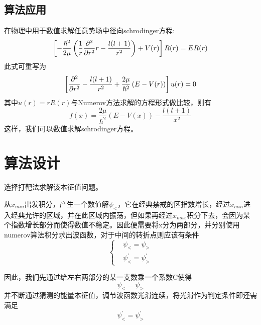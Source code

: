 \documentclass[twoside,twocolumn]{article}
\begin{document}
\begin{CJK*}{UTF8}{gkai}
\subsection{算法应用}
在物理中用于数值求解任意势场中径向schrodinger方程:
\begin{equation*}
\left[-{\hbar ^{2} \over 2\mu }\left({\frac {1}{r}}{\partial ^{2} \over \partial r^{2}}r-{l(l+1) \over r^{2}}\right)+V(r)\right]R(r)=ER(r)
\end{equation*}
此式可重写为
\begin{equation*}
\left[{\partial ^{2} \over \partial r^{2}}-{l(l+1) \over r^{2}}+{2\mu \over \hbar ^{2}}\left(E-V(r)\right)\right]u(r)=0
\end{equation*}
其中$u(r)=rR(r)$与Numerov方法求解的方程形式做比较，则有
\begin{equation*}
f(x)={\frac {2\mu }{\hbar ^{2}}}\left(E-V(x)\right)-{\frac {l(l+1)}{x^{2}}}
\end{equation*}
这样，我们可以数值求解schrodinger方程。


\section{算法设计}
选择打靶法求解该本征值问题。

从$x_{min}$出发积分，产生一个数值解$\psi_{<}$，它在经典禁戒的区指数增长，经过$x_{min}$进入经典允许的区域，并在此区域内振荡，但如果再经过$x_{max}$积分下去，会因为某个指数增长部分而使得数值不稳定。因此便需要将x分为两部分，并分别使用numerov算法积分求出波函数，对于中间的转折点则应该有条件
\begin{equation*}
\left\{
\begin{aligned}
&\psi_{<}=\psi_{>}\\
&\psi_{<}^{\prime}=\psi_{>}^{\prime}
\end{aligned}
\right.
\end{equation*}

因此，我们先通过给左右两部分的某一支数乘一个系数C使得
\begin{equation*}
\psi_{<}=\psi_{>}
\end{equation*}
并不断通过猜测的能量本征值，调节波函数光滑连续，将光滑作为判定条件即还需满足
\begin{equation*}
\psi_{<}^{\prime}=\psi_{>}^{\prime}
\end{equation*}


\end{CJK*}
\end{document}
